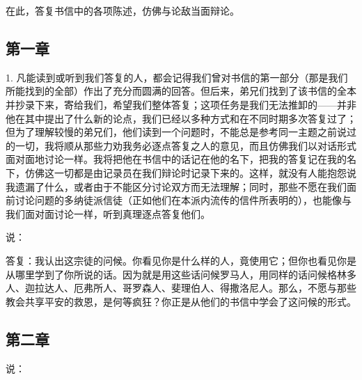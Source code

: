 在此，答复书信中的各项陈述，仿佛与论敌当面辩论。\par


\subsection{第一章}

1. 凡能读到或听到我们答复的人，都会记得我们曾对书信的第一部分（那是我们所能找到的全部）作出了充分而圆满的回答。但后来，弟兄们找到了该书信的全本并抄录下来，寄给我们，希望我们整体答复；这项任务是我们无法推卸的——并非他在其中提出了什么新的论点，我们已经以多种方式和在不同时期多次答复过了；但为了理解较慢的弟兄们，他们读到一个问题时，不能总是参考同一主题之前说过的一切，我将顺从那些力劝我务必逐点答复之人的意见，而且仿佛我们以对话形式面对面地讨论一样。我将把他在书信中的话记在他的名下，把我的答复记在我的名下，仿佛这一切都是由记录员在我们辩论时记录下来的。这样，就没有人能抱怨说我遗漏了什么，或者由于不能区分讨论双方而无法理解；同时，那些不愿在我们面前讨论问题的多纳徒派信徒（正如他们在本派内流传的信件所表明的），也能像与我们面对面讨论一样，听到真理逐点答复他们。\par

说：\par

答复：我认出这宗徒的问候。你看见你是什么样的人，竟使用它；但你也看见你是从哪里学到了你所说的话。因为就是用这些话问候罗马人，用同样的话问候格林多人、迦拉达人、厄弗所人、哥罗森人、斐理伯人、得撒洛尼人。那么，不愿与那些教会共享平安的救恩，是何等疯狂？你正是从他们的书信中学会了这问候的形式。\par


\subsection{第二章}

说：\par


